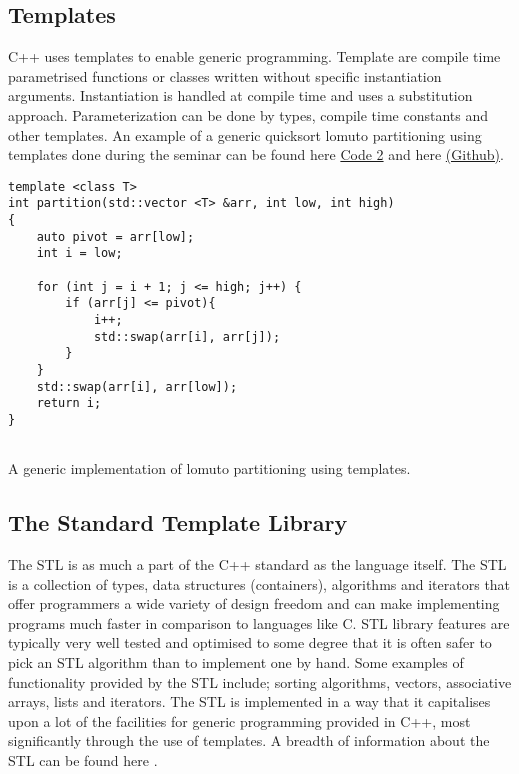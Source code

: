 \documentclass[conference, a4paper]{IEEEtran}
\begin{document}
\subsection{Templates}

C++ uses templates to enable generic programming. Template are compile time parametrised functions or classes written without specific instantiation arguments. Instantiation is handled at compile time and uses a substitution approach. Parameterization can be done by types, compile time constants and other templates. An example of a generic quicksort lomuto partitioning using templates done during the seminar can be found here \hyperref[listing:2]{Code 2} and here \href{https://github.com/qasimwarraich/PLP/blob/master/A2/Task1/quicksort/quicksort.cpp}{(Github)}.


\begin{listing}[htb]
\begin{verbatim}
template <class T>
int partition(std::vector <T> &arr, int low, int high)
{
    auto pivot = arr[low];
    int i = low;

    for (int j = i + 1; j <= high; j++) {
        if (arr[j] <= pivot){
            i++;
            std::swap(arr[i], arr[j]);
        }
    }
    std::swap(arr[i], arr[low]);
    return i; 
}
        
    \end{verbatim}
    
    \caption{A generic implementation of lomuto partitioning using templates.}
\label{listing:2}
\end{listing}

\subsection{The Standard Template Library}
The STL is as much a part of the C++ standard as the language itself. The STL is a collection of types, data structures (containers), algorithms and iterators that offer programmers a wide variety of design freedom and can make implementing programs much faster in comparison to languages like C. STL library features are typically very well tested and optimised to some degree that it is often safer to pick an STL algorithm than to implement one by hand. Some examples of functionality provided by the STL include; sorting algorithms, vectors, associative arrays, lists and iterators. The STL is implemented in a way that it capitalises upon a lot of the facilities for generic programming provided in C++, most significantly through the use of templates. A breadth of information about the STL can be found here \cite{josuttis2012c++}.
\end{document}

